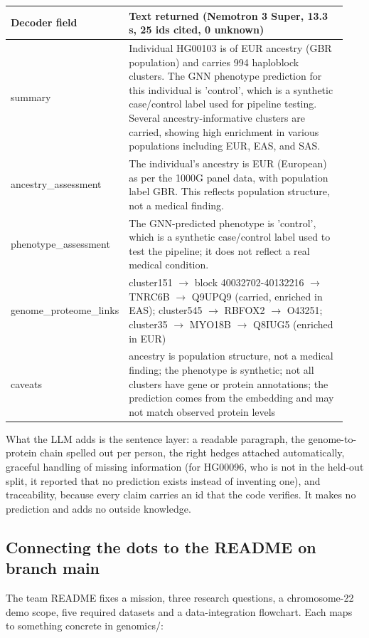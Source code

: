 \documentclass[11pt,a4paper]{article}
\begin{document}
\begin{longtable}{p{0.207\linewidth}p{0.733\linewidth}}
\toprule
\textbf{Decoder field} & \textbf{Text returned (Nemotron 3 Super, 13.3 s, 25 ids cited, 0 unknown)} \\
\midrule
\endhead
summary & Individual HG00103 is of EUR ancestry (GBR population) and carries 994 haploblock clusters. The GNN phenotype prediction for this individual is 'control', which is a synthetic case/control label used for pipeline testing. Several ancestry-informative clusters are carried, showing high enrichment in various populations including EUR, EAS, and SAS. \\
ancestry\_assessment & The individual's ancestry is EUR (European) as per the 1000G panel data, with population label GBR. This reflects population structure, not a medical finding. \\
phenotype\_assessment & The GNN-predicted phenotype is 'control', which is a synthetic case/control label used to test the pipeline; it does not reflect a real medical condition. \\
genome\_proteome\_links & cluster151 $\rightarrow$ block 40032702-40132216 $\rightarrow$ TNRC6B $\rightarrow$ Q9UPQ9 (carried, enriched in EAS); cluster545 $\rightarrow$ RBFOX2 $\rightarrow$ O43251; cluster35 $\rightarrow$ MYO18B $\rightarrow$ Q8IUG5 (enriched in EUR) \\
caveats & ancestry is population structure, not a medical finding; the phenotype is synthetic; not all clusters have gene or protein annotations; the prediction comes from the embedding and may not match observed protein levels \\
\bottomrule
\end{longtable}

What the LLM adds is the sentence layer: a readable paragraph, the genome-to-protein chain spelled out per person, the right hedges attached automatically, graceful handling of missing information (for HG00096, who is not in the held-out split, it reported that no prediction exists instead of inventing one), and traceability, because every claim carries an id that the code verifies. It makes no prediction and adds no outside knowledge.

\subsection{Connecting the dots to the README on branch main}

The team README fixes a mission, three research questions, a chromosome-22 demo scope, five required datasets and a data-integration flowchart. Each maps to something concrete in genomics/:
\end{document}
